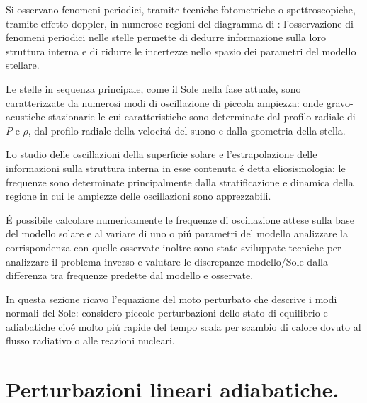 \documentclass[../main.tex]{subfiles}
\begin{document}
Si osservano fenomeni periodici, tramite tecniche fotometriche o spettroscopiche, tramite effetto doppler, in numerose regioni del diagramma di \hr{}: l'osservazione di fenomeni periodici nelle stelle permette di dedurre informazione sulla loro struttura interna e di ridurre le incertezze nello spazio dei parametri del modello stellare.

Le stelle in sequenza principale, come il Sole nella fase attuale, sono caratterizzate da numerosi modi di oscillazione di piccola ampiezza: onde gravo-acustiche stazionarie le cui caratteristiche sono determinate dal profilo radiale di $P$ e $\rho$, dal profilo radiale della velocit\'a del suono e dalla geometria della stella.

Lo studio delle oscillazioni della superficie solare e l'estrapolazione delle informazioni sulla struttura interna in esse contenuta \'e detta eliosismologia: le frequenze sono determinate principalmente dalla stratificazione e dinamica della regione in cui le ampiezze delle oscillazioni sono apprezzabili.

\'E possibile calcolare numericamente le frequenze di oscillazione attese sulla base del modello solare e al variare di uno o pi\'u parametri del modello analizzare la corrispondenza con quelle osservate inoltre sono state sviluppate tecniche per analizzare il problema inverso e valutare le discrepanze modello/Sole dalla differenza tra frequenze predette dal modello e osservate.

In questa sezione ricavo l'equazione del moto perturbato che descrive i modi normali del Sole: considero piccole perturbazioni dello stato di equilibrio e adiabatiche cio\'e molto pi\'u rapide del tempo scala per scambio di calore dovuto al flusso radiativo o alle reazioni nucleari.



{\let\clearpage\relax
\chapter{Perturbazioni lineari adiabatiche.}
}
\end{document}

